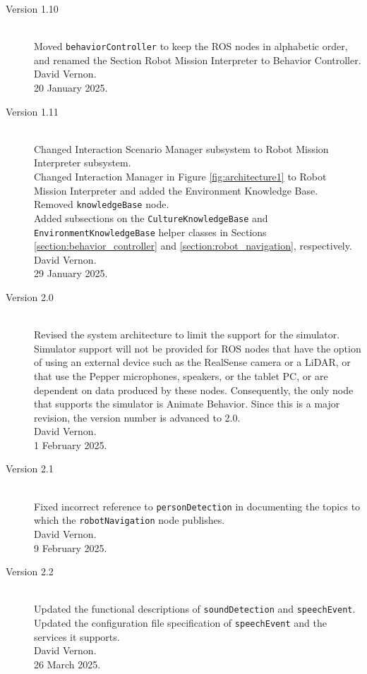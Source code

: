 \documentclass{CSSRforAfrica}
\begin{document}
{\begin{description}
\item [Version 1.10]~\\
Moved {\small \verb+behaviorController+ } to keep the ROS nodes in alphabetic order, and renamed the Section Robot Mission Interpreter to Behavior Controller.\\
David Vernon. \\                          
20 January 2025.

\item [Version 1.11]~\\
Changed Interaction Scenario Manager subsystem to Robot Mission Interpreter subsystem. \\
Changed Interaction Manager in Figure \ref{fig:architecture1} to Robot Mission Interpreter and added the Environment Knowledge Base.\\
Removed {\small \verb+knowledgeBase+ } node.\\
Added subsections on the  {\small \verb+CultureKnowledgeBase+} and {\small \verb+EnvironmentKnowledgeBase+} helper classes in Sections \ref{section:behavior_controller} and \ref{section:robot_navigation}, respectively.\\
David Vernon. \\                          
29 January 2025.

\item [Version 2.0]~\\
Revised the system architecture to limit the support for the simulator.  Simulator support will not be provided for  ROS nodes that have the option of using an external device such as the RealSense camera or a LiDAR, or that use the Pepper microphones, speakers, or the tablet PC, or are dependent on data produced by these nodes. Consequently, the only node that supports the simulator is Animate Behavior.
Since this is a major revision, the version number is advanced to 2.0.\\
David Vernon.\\
1 February 2025.

\item [Version 2.1]~\\
Fixed incorrect reference to {\small \verb+personDetection+} in documenting the topics to which the {\small \verb+robotNavigation+} node publishes.\\
David Vernon.\\
9 February 2025.

\item [Version 2.2]~\\
Updated the functional descriptions of   {\small \verb+soundDetection+} and  {\small \verb+speechEvent+}.  Updated the configuration file specification of  {\small \verb+speechEvent+} and the services it supports. \\
David Vernon.\\
26 March 2025.


\end{description}}
\end{document}
